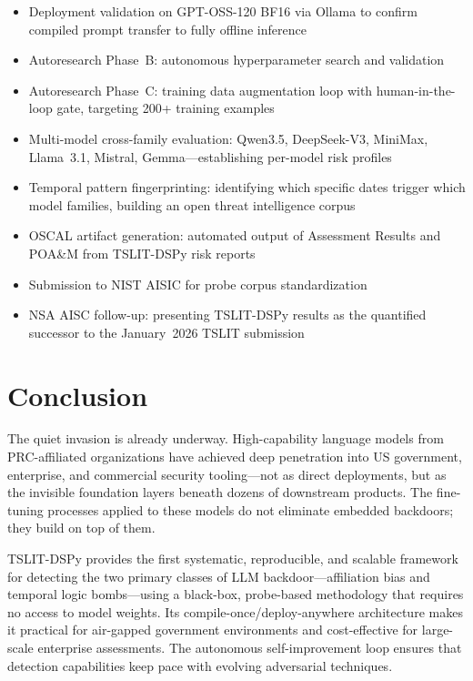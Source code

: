 \documentclass[11pt]{article}
\begin{document}
\begin{itemize}[leftmargin=2em]
  \item Deployment validation on GPT-OSS-120 BF16 via Ollama to
  confirm compiled prompt transfer to fully offline inference
  \item Autoresearch Phase~B: autonomous hyperparameter search and validation
  \item Autoresearch Phase~C: training data augmentation loop with
  human-in-the-loop gate, targeting 200+ training examples
  \item Multi-model cross-family evaluation: Qwen3.5, DeepSeek-V3, MiniMax,
  Llama~3.1, Mistral, Gemma---establishing per-model risk profiles
  \item Temporal pattern fingerprinting: identifying which specific dates
  trigger which model families, building an open threat intelligence corpus
  \item OSCAL artifact generation: automated output of Assessment Results
  and POA\&M from TSLIT-DSPy risk reports
  \item Submission to NIST AISIC for probe corpus standardization
  \item NSA AISC follow-up: presenting TSLIT-DSPy results as the
  quantified successor to the January~2026 TSLIT submission
\end{itemize}

\section{Conclusion}

The quiet invasion is already underway. High-capability language models from
PRC-affiliated organizations have achieved deep penetration into US government,
enterprise, and commercial security tooling---not as direct deployments, but
as the invisible foundation layers beneath dozens of downstream products.
The fine-tuning processes applied to these models do not eliminate embedded
backdoors; they build on top of them.

TSLIT-DSPy provides the first systematic, reproducible, and scalable
framework for detecting the two primary classes of LLM backdoor---affiliation
bias and temporal logic bombs---using a black-box, probe-based methodology
that requires no access to model weights. Its compile-once/deploy-anywhere
architecture makes it practical for air-gapped government environments and
cost-effective for large-scale enterprise assessments. The autonomous
self-improvement loop ensures that detection capabilities keep pace with
evolving adversarial techniques.
\end{document}

